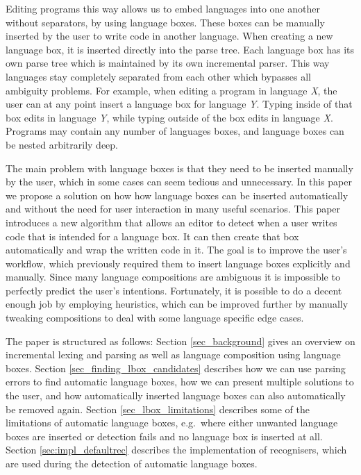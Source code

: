 \documentclass[sigplan,screen]{acmart}\settopmatter{printfolios=true,printccs=false,printacmref=false}
\begin{document}
Editing programs this way allows us to embed languages into one another without
separators, by using language boxes. These boxes can be manually inserted by
the user to write code in another language. When creating a new language box,
it is inserted directly into the parse tree. Each language box has its own
parse tree which is maintained by its own incremental parser. This way
languages stay completely separated from each other which bypasses all
ambiguity problems. For example, when editing a program in language \emph{X},
the user can at any point insert a language box for language \emph{Y}. Typing
inside of that box edits in language \emph{Y}, while typing outside of the box
edits in language \emph{X}. Programs may contain any number of languages
boxes, and language boxes can be nested arbitrarily deep.

The main problem with language boxes is that they need to be inserted manually
by the user, which in some cases can seem tedious and unnecessary. In this
paper we propose a solution on how how language boxes can be inserted
automatically and without the need for user interaction in many useful
scenarios. This paper introduces a new algorithm that allows an editor to
detect when a user writes code that is intended for a language box. It can then
create that box automatically and wrap the written code in it. The goal is to
improve the user's workflow, which previously required them to insert language
boxes explicitly and manually.  Since many language compositions are ambiguous
it is impossible to perfectly predict the user's intentions. Fortunately, it is
possible to do a decent enough job by employing heuristics, which can be
improved further by manually tweaking compositions to deal with some language
specific edge cases.

The paper is structured as follows: Section \ref{sec_background} gives an
overview on incremental lexing and parsing as well as language composition
using language boxes. Section \ref{sec_finding_lbox_candidates}
describes how we can use parsing errors to find automatic language boxes, how
we can present multiple solutions to the user, and how automatically inserted
language boxes can also automatically be removed again. Section
\ref{sec_lbox_limitations} describes some of the limitations of automatic
language boxes, e.g.~where either unwanted language boxes are inserted or
detection fails and no language box is inserted at all. Section
\ref{sec:impl_defaultrec} describes the implementation of recognisers, which
are used during the detection of automatic language boxes.
\end{document}
